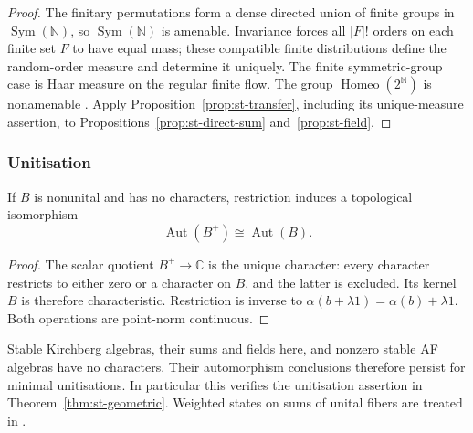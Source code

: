 \begin{proof}
The finitary permutations form a dense directed union of finite groups in $\operatorname{Sym}(\mathbb{N})$, so $\operatorname{Sym}(\mathbb{N})$ is amenable. Invariance forces all $|F|!$ orders on each finite set $F$ to have equal mass; these compatible
finite distributions define the random-order measure and determine it
uniquely. The finite symmetric-group case is Haar measure on the regular
finite flow. The group $\operatorname{Homeo}(2^{\mathbb{N}})$ is nonamenable \cite[remark
following Theorem~6.7]{Tsankov2012}. Apply Proposition~\ref{prop:st-transfer}, including its unique-measure assertion, to Propositions~\ref{prop:st-direct-sum} and~\ref{prop:st-field}.
\end{proof}


\subsubsection{Unitisation}

\begin{lemma}\label{lem:st-unitization}
 If $B$ is nonunital and has no characters,
restriction induces a topological isomorphism 
\begin{equation*}
\operatorname{Aut}(B^+)\cong\operatorname{Aut}(B). 
\end{equation*}
\end{lemma}

\begin{proof}
The scalar quotient $B^+\to\mathbb{C}$ is the unique character: every
character restricts to either zero or a character on $B$, and the latter is
excluded. Its kernel $B$ is therefore characteristic. Restriction is inverse
to $\alpha(b+\lambda1)=\alpha(b)+\lambda1$. Both operations are point-norm
continuous.
\end{proof}

Stable Kirchberg algebras, their sums and fields here, and nonzero
stable AF algebras have no characters. Their automorphism conclusions
therefore persist for minimal unitisations. In particular this verifies
the unitisation assertion in Theorem~\ref{thm:st-geometric}. Weighted
states on sums of unital fibers are treated in \cite{LupiniUnital2026}.

